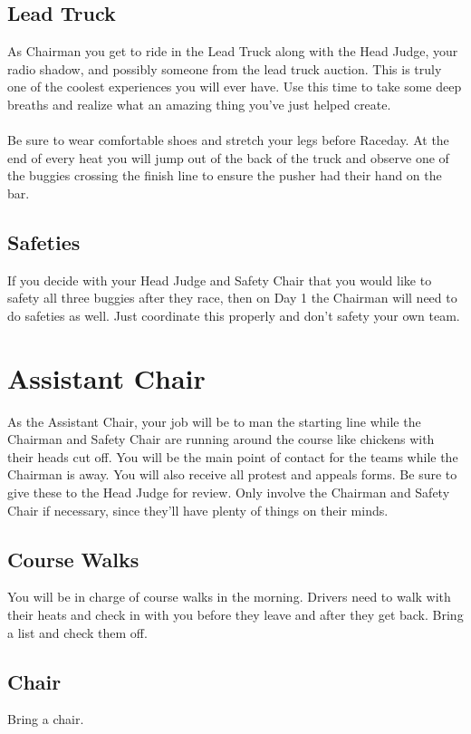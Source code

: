 \subsection{Lead Truck}
As Chairman you get to ride in the Lead Truck along with the Head Judge,
your radio shadow, and possibly someone from the lead truck auction.
This is truly one of the coolest experiences you will ever have. Use this time
to take some deep breaths and realize what an amazing thing you've just helped
create.
\\\\
Be sure to wear comfortable shoes and stretch your legs before Raceday.
At the end of every heat you will jump out of the back of the truck and
observe one of the buggies crossing the finish line to ensure the pusher had
their hand on the bar.

\subsection{Safeties}
If you decide with your Head Judge and Safety Chair that you would like to
safety all three buggies after they race, then on Day 1 the Chairman will need
to do safeties as well. Just coordinate this properly and don't safety your own
team.

\section{Assistant Chair}
As the Assistant Chair, your job will be to man the starting line while
the Chairman and Safety Chair are running around the course like chickens
with their heads cut off. You will be the main point of contact for the teams
while the Chairman is away. You will also receive all protest and appeals
forms. Be sure to give these to the Head Judge for review. Only involve the
Chairman and Safety Chair if necessary, since they'll have plenty of things on
their minds.

\subsection{Course Walks}
You will be in charge of course walks in the morning. Drivers need to
walk with their heats and check in with you before they leave and after they
get back. Bring a list and check them off.

\subsection{Chair}
Bring a chair.


